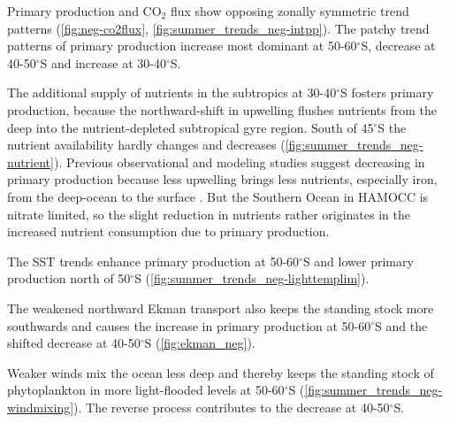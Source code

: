 Primary production and CO$_2$ flux show opposing zonally symmetric trend patterns (\autoref{fig:neg-co2flux}, \ref{fig:summer_trends_neg-intpp}). The patchy trend patterns of primary production increase  most dominant at 50-60$^\circ$S, decrease at 40-50$^\circ$S and increase at 30-40$^\circ$S. %

The additional supply of nutrients in the subtropics at 30-40$^\circ$S fosters primary production, because the northward-shift in upwelling flushes nutrients from the deep into the nutrient-depleted subtropical gyre region. South of 45$^\circ$S the nutrient availability hardly changes and decreases (\autoref{fig:summer_trends_neg-nutrient}). 
Previous observational and modeling studies suggest decreasing in primary production because less upwelling brings less nutrients, especially iron, from the deep-ocean to the surface \citep{Hauck2013,Tagliabue2014}. But the Southern Ocean in \acs{HAMOCC} is nitrate limited, so the slight reduction in nutrients rather originates in the increased nutrient consumption due to primary production.  %


The \acs{SST} trends enhance primary production at 50-60$^\circ$S and lower primary production north of 50$^\circ$S (\autoref{fig:summer_trends_neg-lighttemplim}). %

The weakened northward Ekman transport also keeps the standing stock more southwards and causes the increase in primary production at 50-60$^\circ$S and the shifted decrease at 40-50$^\circ$S (\autoref{fig:ekman_neg}). 

Weaker winds mix the ocean less deep and thereby keeps the standing stock of phytoplankton in more light-flooded levels at 50-60$^\circ$S (\autoref{fig:summer_trends_neg-windmixing}).
The reverse process contributes to the decrease at 40-50$^\circ$S.\newline

